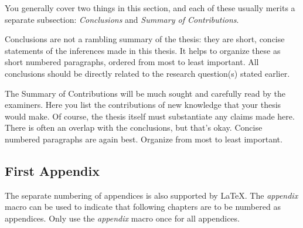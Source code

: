 \documentclass[11pt,a4paper,oneside]{book} %
\numberwithin{equation}{section}
\begin{document}
You generally cover two things in this section, and each of these usually merits
a separate subsection: \textit{Conclusions} and \textit{Summary of
Contributions}.

Conclusions are not a rambling summary of the thesis: they are short, concise
statements of the inferences made in this thesis. It helps to organize these as
short numbered paragraphs, ordered from most to least important. All conclusions
should be directly related to the research question(s) stated earlier.

The Summary of Contributions will be much sought and carefully read by the
examiners. Here you list the contributions of new knowledge that your thesis
would make. Of course, the thesis itself must substantiate any claims made here.
There is often an overlap with the conclusions, but that's okay. Concise numbered
paragraphs are again best. Organize from most to least important.




\begin{appendix}
\chapter{First Appendix}
The separate numbering of appendices is also supported by LaTeX. The \textit{appendix} macro can be used to indicate that following chapters are to be numbered as appendices. Only use the \textit{appendix} macro once for all appendices.
\end{appendix}



\end{document}
